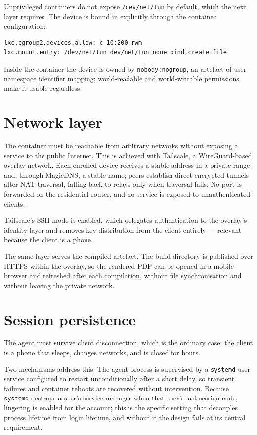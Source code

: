 Unprivileged containers do not expose \texttt{/dev/net/tun} by default, which the next layer requires. The device is bound in explicitly through the container configuration:

\begin{verbatim}
lxc.cgroup2.devices.allow: c 10:200 rwm
lxc.mount.entry: /dev/net/tun dev/net/tun none bind,create=file
\end{verbatim}

Inside the container the device is owned by \texttt{nobody:nogroup}, an artefact of user-namespace identifier mapping; world-readable and world-writable permissions make it usable regardless.

\section{Network layer}
\label{sec:ai-network}

The container must be reachable from arbitrary networks without exposing a service to the public Internet. This is achieved with Tailscale, a WireGuard-based overlay network. Each enrolled device receives a stable address in a private range and, through MagicDNS, a stable name; peers establish direct encrypted tunnels after NAT traversal, falling back to relays only when traversal fails. No port is forwarded on the residential router, and no service is exposed to unauthenticated clients.

Tailscale's SSH mode is enabled, which delegates authentication to the overlay's identity layer and removes key distribution from the client entirely --- relevant because the client is a phone.

The same layer serves the compiled artefact. The build directory is published over HTTPS within the overlay, so the rendered PDF can be opened in a mobile browser and refreshed after each compilation, without file synchronisation and without leaving the private network.

\section{Session persistence}
\label{sec:ai-persistence}

The agent must survive client disconnection, which is the ordinary case: the client is a phone that sleeps, changes networks, and is closed for hours.

Two mechanisms address this. The agent process is supervised by a \texttt{systemd} user service configured to restart unconditionally after a short delay, so transient failures and container reboots are recovered without intervention. Because \texttt{systemd} destroys a user's service manager when that user's last session ends, lingering is enabled for the account; this is the specific setting that decouples process lifetime from login lifetime, and without it the design fails at its central requirement.

